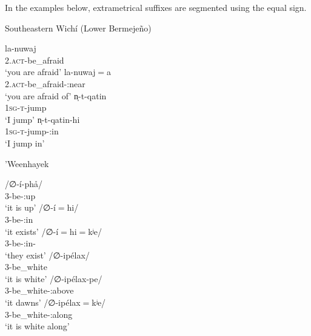 In the examples below, extrametrical suffixes are segmented using the equal sign.

\newpage
\ea
Southeastern Wichí (Lower Bermejeño) \citep[396--397]{VN14}\\
    \begin{xlist}
        \ex\gll la-nuwaj~\\
                2.{\textsc{act}}-be\_afraid\\
                \glt `you are afraid'
        \ex\gll la-nuwaj$=$a~\\
                2.{\textsc{act}}-be\_afraid-\APPL:near\\
                \glt `you are afraid of'
        \ex \gll n̩-t-qatin~\\
             1\textsc{sg-t}-jump\\
             \glt `I jump'
        \ex \gll n̩-t-qatin-hi~\\
             1\textsc{sg-t}-jump-\APPL:in\\
             \glt `I jump in'
    \end{xlist}
\z
\ea
'Weenhayek \citep[22--23, 33]{KC16}\\
    \begin{xlist}
        \ex\gll /∅-í-phå/~\\
                3-be-\APPL:up\\
                \glt `it is up'
        \ex\gll /∅-í$=$hi/~\\
                3-be-\APPL:in\\
                \glt `it exists'
        \ex\gll /∅-í$=$hi$=$kʲe/~\\
                3-be-\APPL:in-\PL\\
                \glt `they exist'
        \ex\gll /∅-ipélax/~\\
                3-be\_white\\
                \glt `it is white'
        \ex\gll /∅-ipélax-pe/~\\
                3-be\_white-\APPL:above\\
                \glt `it dawns'
        \ex\gll /∅-ipélax$=$kʲe/~\\
                3-be\_white-\APPL:along\\
                \glt `it is white along'
    \end{xlist}
\z

